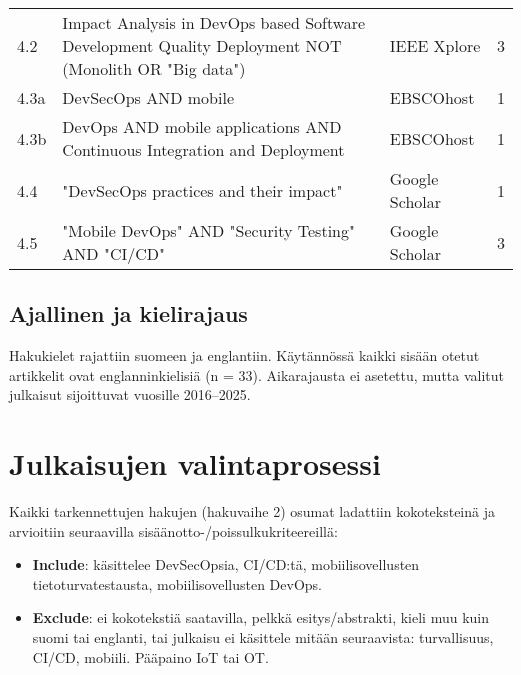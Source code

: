 \documentclass[bscthesis,finnish,oneside,biblatex]{uefcsthesis}
\begin{document}
\begin{table}[htbp]
\begin{tabularx}{\textwidth}{l>{\ttfamily\small\raggedright\arraybackslash}X l r}
    4.2  & Impact Analysis in DevOps based Software Development Quality Deployment NOT (Monolith OR "Big data")                      & IEEE Xplore    & 3  \\
    4.3a & DevSecOps AND mobile                                                                                                      & EBSCOhost      & 1  \\
    4.3b & DevOps AND mobile applications AND Continuous Integration and Deployment                                                  & EBSCOhost      & 1  \\
    4.4  & "DevSecOps practices and their impact"                                                                                    & Google Scholar & 1  \\
    4.5  & "Mobile DevOps" AND "Security Testing" AND "CI/CD"                                                                        & Google Scholar & 3  \\
    \bottomrule
  \end{tabularx}
\end{table}

\subsection{Ajallinen ja kielirajaus}
\label{sec:search-limits}

Hakukielet rajattiin suomeen ja englantiin. Käytännössä kaikki sisään
otetut artikkelit ovat englanninkielisiä (n = 33). Aikarajausta ei asetettu, mutta
valitut julkaisut sijoittuvat vuosille 2016–2025.

\section{Julkaisujen valintaprosessi}
\label{sec:selection}

Kaikki tarkennettujen hakujen (hakuvaihe 2) osumat ladattiin
kokoteksteinä ja arvioitiin seuraavilla sisäänotto-/poissulkukriteereillä:

\begin{itemize}
  \item \textbf{Include}: käsittelee DevSecOpsia, CI/CD:tä, mobiilisovellusten tietoturvatestausta, mobiilisovellusten DevOps.
  \item \textbf{Exclude}: ei kokotekstiä saatavilla, pelkkä esitys/abstrakti,
        kieli muu kuin suomi tai englanti, tai julkaisu ei käsittele mitään
        seuraavista: turvallisuus, CI/CD, mobiili. Pääpaino IoT tai OT.
\end{itemize}
\end{document}
